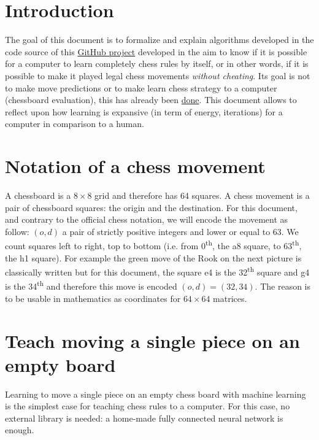 \documentclass[a4paper,10pt]{article}
\begin{document}
%
\newcommand{\norm}[1]{\left\lVert#1\right\rVert}
%
\newcommand\mycommfont[1]{\footnotesize\ttfamily\textcolor{blue}{#1}}

\section*{Introduction}

The goal of this document is to formalize and explain algorithms developed in
the code source of this
\href{https://github.com/Lecrapouille/ChessNeuNeu}{GitHub project} developed in
the aim to know if it is possible for a computer to learn completely chess rules
by itself, or in other words, if it is possible to make it played legal chess
movements \textit{without cheating}. Its goal is not to make move predictions or
to make learn chess strategy to a computer (chessboard evaluation), this has
already been \href{https://github.com/ashudeep/ConvChess}{done}. This document
allows to reflect upon how learning is expansive (in term of energy, iterations)
for a computer in comparison to a human.

\section{Notation of a chess movement}
A chessboard is a $8 \times 8$ grid and therefore has 64 squares. A chess
movement is a pair of chessboard squares: the origin and the destination.  For
this document, and contrary to the official chess notation, we will encode the
movement as follow: $(o, d)$ a pair of strictly positive integers and lower or
equal to 63. We count squares left to right, top to bottom (i.e. from
0\textsuperscript{th}, the a8 square, to 63\textsuperscript{th}, the h1
square). For example the green move of the Rook on the next picture is
classically written  but for this document, the square e4 is the
32\textsuperscript{th} square and g4 is the 34\textsuperscript{th} and therefore
this move is encoded $(o, d) = (32, 34)$. The reason is to be usable in
mathematics as coordinates for $64 \times 64$ matrices.

\section{Teach moving a single piece on an empty board}

Learning to move a single piece on an empty chess board with machine learning is
the simplest case for teaching chess rules to a computer. For this case, no
external library is needed: a home-made fully connected neural network is
enough.
\end{document}
